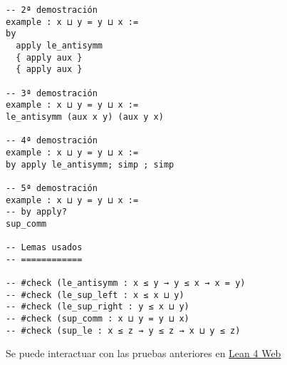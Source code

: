 \begin{verbatim}
-- 2ª demostración
example : x ⊔ y = y ⊔ x :=
by
  apply le_antisymm
  { apply aux }
  { apply aux }

-- 3ª demostración
example : x ⊔ y = y ⊔ x :=
le_antisymm (aux x y) (aux y x)

-- 4ª demostración
example : x ⊔ y = y ⊔ x :=
by apply le_antisymm; simp ; simp

-- 5ª demostración
example : x ⊔ y = y ⊔ x :=
-- by apply?
sup_comm

-- Lemas usados
-- ============

-- #check (le_antisymm : x ≤ y → y ≤ x → x = y)
-- #check (le_sup_left : x ≤ x ⊔ y)
-- #check (le_sup_right : y ≤ x ⊔ y)
-- #check (sup_comm : x ⊔ y = y ⊔ x)
-- #check (sup_le : x ≤ z → y ≤ z → x ⊔ y ≤ z)
\end{verbatim}
Se puede interactuar con las pruebas anteriores en \href{https://lean.math.hhu.de/\#url=https://raw.githubusercontent.com/jaalonso/Calculemus2/main/src/Conmutatividad\_del\_supremo.lean}{Lean 4 Web}


